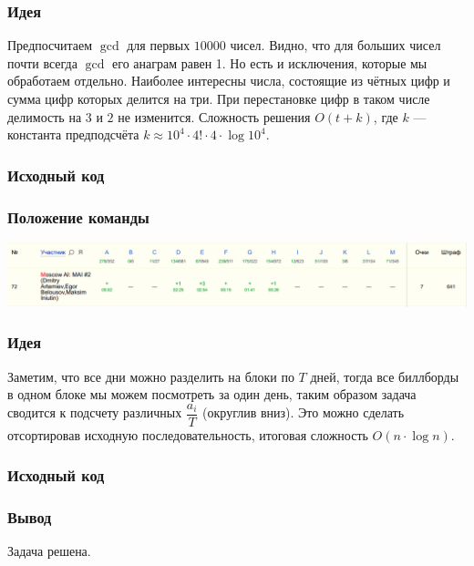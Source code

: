 \subsubsection*{Идея}
Предпосчитаем $\gcd$ для первых $10000$ чисел. Видно, что для больших чисел почти всегда $\gcd$ его анаграм равен 1. Но есть и исключения, которые мы обработаем отдельно. Наиболее интересны числа, состоящие из чётных цифр и сумма цифр которых делится на три. При перестановке цифр в таком числе делимость на $3$ и $2$ не изменится. Сложность решения $O(t +k)$, где $k$ --- константа предподсчёта $k \approx 10 ^ 4 \cdot 4! \cdot 4 \cdot \log{10 ^ 4}$.
\subsubsection*{Исходный код}

\subsubsection*{Положение команды}
\includegraphics[scale=0.25]{images/moscow_regional.png}\newline\noindent
\pagebreak


\subsubsection*{Идея}
Заметим, что все дни можно разделить на блоки по $T$ дней, тогда все биллборды в одном блоке мы можем посмотреть за один день, таким образом задача сводится к подсчету различных $\dfrac{a_{i}}{T}$ (округлив вниз). Это можно сделать отсортировав исходную последовательность, итоговая сложность $O(n \cdot \log{n})$.
\subsubsection*{Исходный код}

\subsubsection*{Вывод}
Задача решена.
